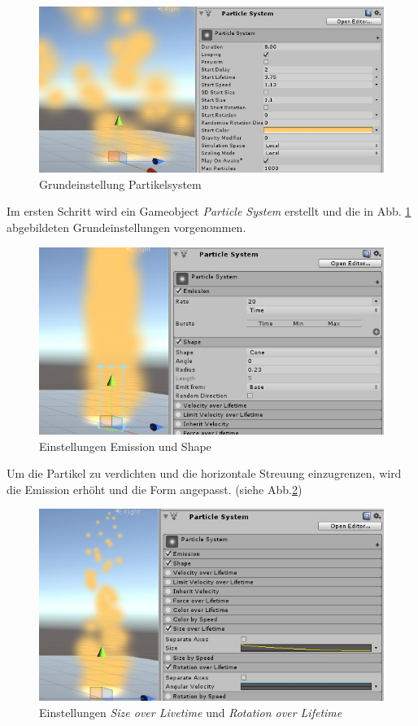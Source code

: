 \begin{figure}[H]
\centering
\includegraphics[width=0.95\linewidth]{Abbildungen/Unity/Fire/fire1}
\caption{Grundeinstellung Partikelsystem}
\label{fig:fire1}
\end{figure}

Im ersten Schritt wird ein Gameobject \textit{Particle System} erstellt und die in Abb. \ref{fig:fire1} abgebildeten Grundeinstellungen vorgenommen.

\begin{figure}[h!]
\centering
\includegraphics[width=0.95\linewidth]{Abbildungen/Unity/Fire/fire2}
\caption{Einstellungen Emission und Shape}
\label{fig:fire2}
\end{figure}

Um die Partikel zu verdichten und die horizontale Streuung einzugrenzen, wird die Emission erhöht und die Form angepasst. (siehe Abb.\ref{fig:fire2}) 

\begin{figure}[h!]
\centering
\includegraphics[width=0.95\linewidth]{Abbildungen/Unity/Fire/fire3}
\caption{Einstellungen \textit{Size over Livetime} und \textit{Rotation over Lifetime}}
\label{fig:fire3}
\end{figure}

